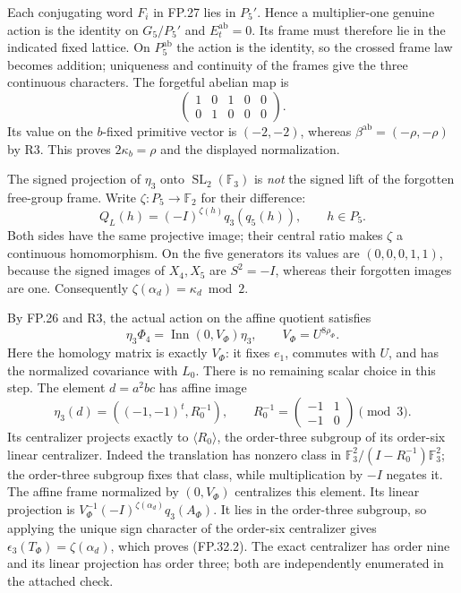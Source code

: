 Each conjugating word $F_i$ in FP.27 lies in $P_5'$. Hence a
multiplier-one genuine action is the identity on $G_5/P_5'$ and
$E_t^{\mathrm{ab}}=0$. Its frame must therefore lie in the indicated
fixed lattice. On $P_5^{\mathrm{ab}}$ the action is the identity,
so the crossed frame law becomes addition; uniqueness and continuity
of the frames give the three continuous characters.
The forgetful abelian map is
\[
 \begin{pmatrix}1&0&1&0&0\\0&1&0&0&0\end{pmatrix}.
\]
Its value on the $b$-fixed primitive vector is $(-2,-2)$, whereas
$\beta^{\mathrm{ab}}=(-\rho,-\rho)$ by R3. This proves
$2\kappa_b=\rho$ and the displayed normalization.

The signed projection of $\eta_3$ onto
$\operatorname{SL}_2(\mathbb F_3)$ is \emph{not} the signed lift
of the forgotten free-group frame. Write $\zeta:P_5\to\mathbb F_2$
for their difference:
\[
 Q_L(h)=(-I)^{\zeta(h)}q_3(q_5(h)),\qquad h\in P_5.
 \tag{FP.32.4}
\]
Both sides have the same projective image; their central ratio makes
$\zeta$ a continuous homomorphism. On the five generators its values
are $(0,0,0,1,1)$, because the signed images of $X_4,X_5$ are
$S^2=-I$, whereas their forgotten images are one.
Consequently $\zeta(\alpha_d)=\kappa_d\bmod2$.

By FP.26 and R3, the actual action on the affine quotient satisfies
\[
 \eta_3\Phi_4=\operatorname{Inn}(0,V_\Phi)\eta_3,
 \qquad V_\Phi=U^{8\rho_\Phi}.
\]
Here the homology matrix is exactly $V_\Phi$: it fixes $e_1$,
commutes with $U$, and has the normalized covariance with $L_0$.
There is no remaining scalar choice in this step.
The element $d=a^2bc$ has affine image
\[
 \eta_3(d)=\left((-1,-1)^t,R_0^{-1}\right),\qquad
 R_0^{-1}=\begin{pmatrix}-1&1\\-1&0\end{pmatrix}\pmod3.
\]
Its centralizer projects exactly to $\langle R_0\rangle$, the
order-three subgroup of its order-six linear centralizer. Indeed
the translation has nonzero class in
$\mathbb F_3^2/(I-R_0^{-1})\mathbb F_3^2$; the order-three subgroup
fixes that class, while multiplication by $-I$ negates it.
The affine frame normalized by $(0,V_\Phi)$ centralizes this element.
Its linear projection is
$V_\Phi^{-1}(-I)^{\zeta(\alpha_d)}q_3(A_\Phi)$.
It lies in the order-three subgroup, so applying the unique sign
character of the order-six centralizer gives
$\epsilon_3(T_\Phi)=\zeta(\alpha_d)$, which proves (FP.32.2).
The exact centralizer has order nine and its linear projection has
order three; both are independently enumerated in the attached check.

